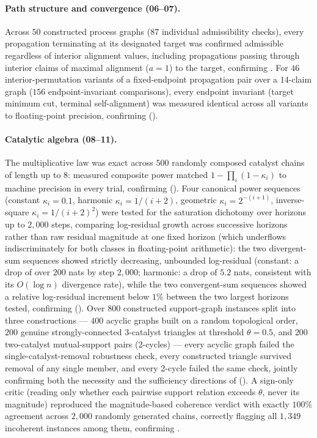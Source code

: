 \documentclass[11pt,twocolumn,a4paper]{article}
\theoremstyle{thmstyle}
\theoremstyle{definition}
\theoremstyle{remark}
\newcommand{\pot}{\kappa}
\begin{document}
\paragraph{Path structure and convergence (06--07).}
Across $50$ constructed process graphs ($87$ individual admissibility
checks), every propagation terminating at its designated target was
confirmed admissible regardless of interior alignment values, including
propagations passing through interior claims of maximal alignment
($a=1$) to the target, confirming . For $46$
interior-permutation variants of a fixed-endpoint propagation pair over a
$14$-claim graph ($156$ endpoint-invariant comparisons), every endpoint
invariant (target minimum cut, terminal self-alignment) was measured
identical across all variants to floating-point precision, confirming
 ().

\paragraph{Catalytic algebra (08--11).}
The multiplicative law was exact across $500$ randomly composed catalyst
chains of length up to $8$: measured composite power matched
$1-\prod_i(1-\pot_i)$ to machine precision in every trial, confirming
 (). Four
canonical power sequences (constant $\pot_i=0.1$, harmonic
$\pot_i=1/(i+2)$, geometric $\pot_i=2^{-(i+1)}$, inverse-square
$\pot_i=1/(i+2)^2$) were tested for the saturation dichotomy over horizons
up to $2{,}000$ steps, comparing log-residual growth across successive
horizons rather than raw residual magnitude at one fixed horizon (which
underflows indiscriminately for both classes in floating-point
arithmetic): the two divergent-sum sequences showed strictly decreasing,
unbounded log-residual (constant: a drop of over $200$ nats by step
$2{,}000$; harmonic: a drop of $5.2$ nats, consistent with its
$O(\log n)$ divergence rate), while the two convergent-sum sequences
showed a relative log-residual increment below $1\%$ between the two
largest horizons tested, confirming 
(). Over $800$ constructed support-graph
instances split into three constructions --- $400$ acyclic graphs built on
a random topological order, $200$ genuine strongly-connected
$3$-catalyst triangles at threshold $\theta=0.5$, and $200$ two-catalyst
mutual-support pairs (2-cycles) --- every acyclic graph failed the
single-catalyst-removal robustness check, every constructed triangle
survived removal of any single member, and every 2-cycle failed the same
check, jointly confirming both the necessity and the sufficiency
directions of  (). A
sign-only critic (reading only whether each pairwise support relation
exceeds $\theta$, never its magnitude) reproduced the magnitude-based
coherence verdict with exactly $100\%$ agreement across $2{,}000$ randomly
generated chains, correctly flagging all $1{,}349$ incoherent instances
among them, confirming .
\end{document}
